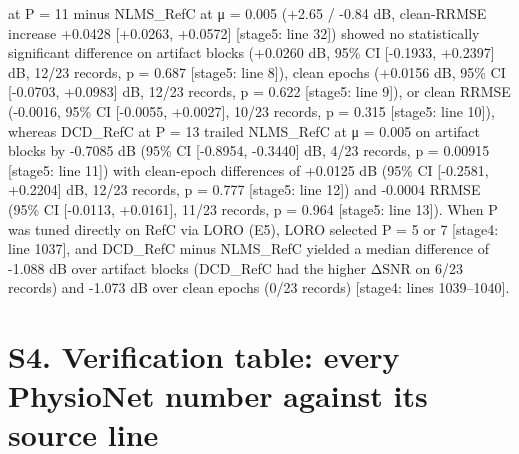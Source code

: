 \documentclass[
  9pt,
]{article}
\begin{document}
at P = 11 minus NLMS\_RefC at μ = 0.005 (+2.65 / -0.84 dB, clean-RRMSE
increase +0.0428 {[}+0.0263, +0.0572{]} {[}stage5: line 32{]}) showed no
statistically significant difference on artifact blocks (+0.0260 dB,
95\% CI {[}-0.1933, +0.2397{]} dB, 12/23 records, p = 0.687 {[}stage5:
line 8{]}), clean epochs (+0.0156 dB, 95\% CI {[}-0.0703, +0.0983{]} dB,
12/23 records, p = 0.622 {[}stage5: line 9{]}), or clean RRMSE (-0.0016,
95\% CI {[}-0.0055, +0.0027{]}, 10/23 records, p = 0.315 {[}stage5: line
10{]}), whereas DCD\_RefC at P = 13 trailed NLMS\_RefC at μ = 0.005 on
artifact blocks by -0.7085 dB (95\% CI {[}-0.8954, -0.3440{]} dB, 4/23
records, p = 0.00915 {[}stage5: line 11{]}) with clean-epoch differences
of +0.0125 dB (95\% CI {[}-0.2581, +0.2204{]} dB, 12/23 records, p =
0.777 {[}stage5: line 12{]}) and -0.0004 RRMSE (95\% CI {[}-0.0113,
+0.0161{]}, 11/23 records, p = 0.964 {[}stage5: line 13{]}). When P was
tuned directly on RefC via LORO (E5), LORO selected P = 5 or 7
{[}stage4: line 1037{]}, and DCD\_RefC minus NLMS\_RefC yielded a median
difference of -1.088 dB over artifact blocks (DCD\_RefC had the higher
ΔSNR on 6/23 records) and -1.073 dB over clean epochs (0/23 records)
{[}stage4: lines 1039--1040{]}.

\hypertarget{s4.-verification-table-every-physionet-number-against-its-source-line}{%
\section{S4. Verification table: every PhysioNet number against its
source
line}\label{s4.-verification-table-every-physionet-number-against-its-source-line}}
\end{document}
